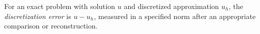 
For an exact problem with solution $u$ and discretized approximation $u_h$, the \emph{discretization error} is $u-u_h$, measured in a specified norm after an appropriate comparison or reconstruction.
